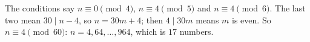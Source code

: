 The conditions say $n\equiv0\pmod4$, $n\equiv4\pmod5$ and $n\equiv4\pmod6$. The last two mean $30\mid n-4$, so $n=30m+4$; then $4\mid30m$ means $m$ is even. So $n\equiv4\pmod{60}$: $n=4,64,\dots,964$, which is $\boxed{17}$ numbers.
